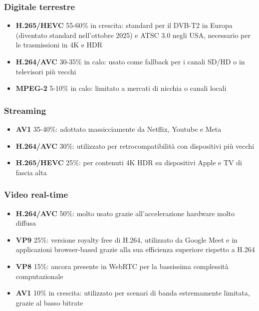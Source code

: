\subsubsection*{Digitale terrestre}
\begin{itemize}
	\item \textbf{H.265/HEVC} 55-60\% in crescita: standard per il DVB-T2 in Europa (diventato standard nell'ottobre 2025)
	e ATSC 3.0 negli USA, necessario per le trasmissioni in 4K e HDR
	\item \textbf{H.264/AVC} 30-35\% in calo: usato come fallback per i canali SD/HD o in televisori più vecchi
	\item \textbf{MPEG-2} 5-10\% in calo: limitato a mercati di nicchia o canali locali
\end{itemize}

\subsubsection*{Streaming}
\begin{itemize}
	\item \textbf{AV1} 35-40\%: adottato massicciamente da Netflix, Youtube e Meta
	\item \textbf{H.264/AVC} 30\%: utilizzato per retrocompatibilità con dispositivi più vecchi
	\item \textbf{H.265/HEVC} 25\%: per contenuti 4K HDR su dispositivi Apple e TV di fascia alta
\end{itemize}

\subsubsection*{Video real-time}
\begin{itemize}
	\item \textbf{H.264/AVC} 50\%: molto usato grazie all'accelerazione hardware molto diffusa
	\item \textbf{VP9} 25\%: versione royalty free di H.264, utilizzato da Google Meet e in applicazioni browser-based grazie
	alla sua efficienza superiore rispetto a H.264
	\item \textbf{VP8} 15\%: ancora presente in WebRTC per la bassissima complessità computazionale
	\item \textbf{AV1} 10\% in crescita: utilizzato per scenari di banda estremamente limitata, grazie al basso bitrate
\end{itemize}
